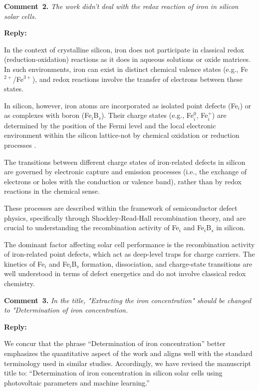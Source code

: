 \documentclass[a4paper,fleqn]{cas-sc}
\begin{document}
%

\vspace{1cm}
\noindent
\textcolor[rgb]{0.00,0.50,1.00}{\textbf{Comment~2.}}
\emph{The work didn't deal with the redox reaction of iron in silicon solar cells.}

\noindent
\textcolor[rgb]{0.51,0.00,0.00}{\textbf{Reply:}}

In the context of crystalline silicon, iron does not participate in classical redox (reduction-oxidation) reactions as it does in aqueous solutions or oxide matrices.
In such environments, iron can exist in distinct chemical valence states (e.g., Fe$^{2+}$/Fe$^{3+}$), and redox reactions involve the transfer of electrons between these states.


In silicon, however, iron atoms are incorporated as isolated point defects (Fe$_i$) or as complexes with boron (Fe$_i$B$_s$).
Their charge states (e.g., Fe$_i^0$, Fe$_i^+$) are determined by the position of the Fermi level and the local electronic environment within the silicon lattice-not by chemical oxidation or reduction processes \cite{weber1983}.


The transitions between different charge states of iron-related defects in silicon are governed by electronic capture and emission processes (i.e., the exchange of electrons or holes with the conduction or valence band), rather than by redox reactions in the chemical sense.


These processes are described within the framework of semiconductor defect physics, specifically through Shockley-Read-Hall recombination theory, and are crucial to understanding the recombination activity of Fe$_i$ and Fe$_i$B$_s$ in silicon.


The dominant factor affecting solar cell performance is the recombination activity of iron-related point defects, which act as deep-level traps for charge carriers.
The kinetics of Fe$_i$ and Fe$_i$B$_s$ formation, dissociation, and charge-state transitions are well understood in terms of defect energetics and do not involve classical redox chemistry.


\vspace{1cm}
\noindent
\textcolor[rgb]{0.00,0.50,1.00}{\textbf{Comment~3.}}
\emph{In the title, "Extracting the iron concentration" should be changed to "Determination of iron concentration.}

\noindent
\textcolor[rgb]{0.51,0.00,0.00}{\textbf{Reply:}}

We concur that the phrase ``Determination of iron concentration'' better emphasizes the quantitative aspect 
of the work and aligns well with the standard terminology used in similar studies.
Accordingly, we have revised the manuscript title to:
``Determination of iron concentration in silicon solar cells using photovoltaic parameters and machine learning.''
\end{document}
